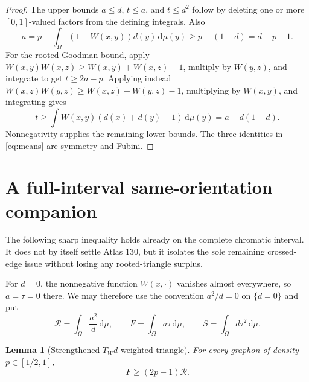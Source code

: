 \documentclass[11pt]{article}
\newtheorem{lemma}[theorem]{Lemma}
\newcommand{\dd}{\,\mathrm d}
\begin{document}
\begin{proof}
The upper bounds $a\leq d$, $t\leq a$, and $t\leq d^2$ follow by deleting
one or more $[0,1]$-valued factors from the defining integrals.  Also
\[
 a=p-\int_\Omega(1-W(x,y))d(y)\dd\mu(y)
 \geq p-(1-d)=d+p-1.
\]
For the rooted Goodman bound, apply
$W(x,y)W(x,z)\geq W(x,y)+W(x,z)-1$, multiply by $W(y,z)$,
and integrate to get $t\geq2a-p$.  Applying instead
$W(x,z)W(y,z)\geq W(x,z)+W(y,z)-1$, multiplying by $W(x,y)$,
and integrating gives
\[
 t\geq\int W(x,y)(d(x)+d(y)-1)\dd\mu(y)
 =a-d(1-d).
\]
Nonnegativity supplies the remaining lower bounds.  The three identities in
\eqref{eq:means} are symmetry and Fubini.
\end{proof}

\section{A full-interval same-orientation companion}

The following sharp inequality holds already on the complete chromatic
interval.  It does not by itself settle Atlas 130, but it isolates the sole
remaining crossed-edge issue without losing any rooted-triangle surplus.

For $d=0$, the nonnegative function $W(x,\cdot)$ vanishes almost everywhere,
so $a=\tau=0$ there.  We may therefore use the convention $a^2/d=0$ on
$\{d=0\}$ and put
\[
 \mathcal R=\int_\Omega\frac{a^2}{d}\dd\mu,
 \qquad F=\int_\Omega a\tau\dd\mu,
 \qquad S=\int_\Omega d\tau^2\dd\mu.
\]

\begin{lemma}[Strengthened $T_Wd$-weighted triangle]
\label{lem:strengthened-weight}
For every graphon of density $p\in[1/2,1]$,
\begin{equation}
 F\geq(2p-1)\mathcal R.
 \label{eq:strengthened-weight}
\end{equation}
\end{lemma}
\end{document}
